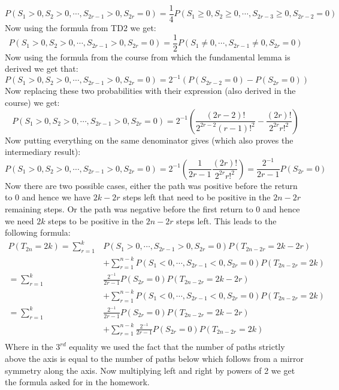 \documentclass[10pt,a4paper]{article}
\begin{document}
\begin{enumerate}
\[
P(S_1 > 0, S_2 > 0, \cdots, S_{2r-1} > 0, S_{2r} = 0) = \frac{1}{4} P(S_1 \geq 0, S_2 \geq 0, \cdots, S_{2r - 3} \geq 0, S_{2r - 2} = 0)
\]
Now using the formula from TD2 we get:
\[
P(S_1 > 0, S_2 > 0, \cdots, S_{2r-1} > 0, S_{2r} = 0) = \frac{1}{2} P(S_1 \neq 0, \cdots, S_{2r - 1} \neq 0, S_{2r} = 0)
\]
Now using the formula from the course from which the fundamental lemma is derived we get that:
\[
P(S_1 > 0, S_2 > 0, \cdots, S_{2r-1} > 0, S_{2r} = 0) = 2^{-1} (P(S_{2r  -2} = 0) - P(S_{2r} = 0))
\]
Now replacing these two probabilities with their expression (also derived in the course) we get:
\[
P(S_1 > 0, S_2 > 0, \cdots, S_{2r-1} > 0, S_{2r} = 0) = 2^{-1}\left( \frac{(2r - 2)!}{2^{2r - 2} (r - 1)!^2} - \frac{(2r)!}{2^{2r} r!^2} \right)
\]
Now putting everything on the same denominator gives (which also proves the intermediary result):
\[
P(S_1 > 0, S_2 > 0, \cdots, S_{2r-1} > 0, S_{2r} = 0)  = 2^{-1}\left( \frac{1}{2r - 1} \frac{(2r)!}{2^{2r} r!^2} \right) = \frac{2^{-1}}{2r - 1} P(S_{2r} = 0)
\]
Now there are two possible cases, either the path was positive before the return to 0 and hence we have $2k - 2r$ steps left that need to be positive in the $2n - 2r$ remaining steps. Or the path was negative before the first return to 0 and hence we need $2k$ steps to be positive in the $2n - 2r$ steps left. This leads to the following formula:
\begin{align*}
P(T_{2n} = 2k) = \sum_{r = 1}^k &P(S_1 > 0, \cdots, S_{2r - 1} > 0, S_{2r} = 0) P(T_{2n - 2r} = 2k - 2r) \\
&+ \sum_{r = 1}^{n - k} P(S_1 < 0, \cdots, S_{2r - 1} < 0, S_{2r} = 0) P(T_{2n - 2r} = 2k)\\
= \sum_{r = 1}^k &\frac{2^{-1}}{2r - 1} P(S_{2r} = 0) P(T_{2n - 2r} = 2k - 2r) \\
&+ \sum_{r = 1}^{n - k} P(S_1 < 0, \cdots, S_{2r - 1} < 0, S_{2r} = 0) P(T_{2n - 2r} = 2k)\\
= \sum_{r = 1}^k &\frac{2^{-1}}{2r - 1} P(S_{2r} = 0) P(T_{2n - 2r} = 2k - 2r) \\
&+ \sum_{r = 1}^{n - k} \frac{2^{-1}}{2r - 1} P(S_{2r} = 0) P(T_{2n - 2r} = 2k)\\
\end{align*}
Where in the $3^{rd}$ equality we used the fact that the number of paths strictly above the axis is equal to the number of paths below which follows from a mirror symmetry along the axis. Now multiplying left and right by powers of 2 we get the formula asked for in the homework.


\end{enumerate}
\end{document}
